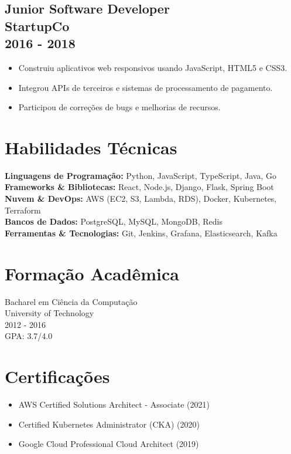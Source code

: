 \documentclass{article}
\begin{document}
\subsection*{Junior Software Developer \\ StartupCo \\ 2016 - 2018}
\begin{itemize}
    \item Construiu aplicativos web responsivos usando JavaScript, HTML5 e CSS3.
    \item Integrou APIs de terceiros e sistemas de processamento de pagamento.
    \item Participou de correções de bugs e melhorias de recursos.
\end{itemize}

\section*{Habilidades Técnicas}
\textbf{Linguagens de Programação:} Python, JavaScript, TypeScript, Java, Go\\ 
\textbf{Frameworks \& Bibliotecas:} React, Node.js, Django, Flask, Spring Boot\\ 
\textbf{Nuvem \& DevOps:} AWS (EC2, S3, Lambda, RDS), Docker, Kubernetes, Terraform\\ 
\textbf{Bancos de Dados:} PostgreSQL, MySQL, MongoDB, Redis\\ 
\textbf{Ferramentas \& Tecnologias:} Git, Jenkins, Grafana, Elasticsearch, Kafka

\section*{Formação Acadêmica}
Bacharel em Ciência da Computação \\ University of Technology \\ 2012 - 2016 \\ GPA: 3.7/4.0

\section*{Certificações}
\begin{itemize}
    \item AWS Certified Solutions Architect - Associate (2021)
    \item Certified Kubernetes Administrator (CKA) (2020)
    \item Google Cloud Professional Cloud Architect (2019)
\end{itemize}
\end{document}
